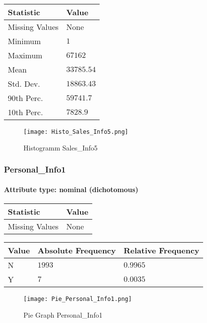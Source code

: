 \begin{table}[H]
	\renewcommand{\arraystretch}{1.25}
	\begin{tabular}{l|l}
		\textbf{Statistic} & \textbf{Value}\\\hline
		Missing Values& None\\\hline
		Minimum& $1$\\\hline
		Maximum& $67162$\\\hline
		Mean& $33785.54$\\\hline
		Std. Dev.& $18863.43$\\\hline
		90th Perc. & $59741.7$\\\hline
		10th Perc. & $7828.9$ \\		
	\end{tabular}
\end{table}
\begin{figure}[H]
	\begin{center}
		\texttt{[image: Histo\_Sales\_Info5.png]}
	\end{center}
	\caption{Histogramm Sales\_Info5}
\end{figure}

\subsubsection{Personal\_Info1}
\paragraph{Attribute type: nominal (dichotomous)}\quad

\begin{table}[H]
	\renewcommand{\arraystretch}{1.25}
	\begin{tabular}{l|l}
		\textbf{Statistic} & \textbf{Value}\\\hline
		Missing Values& None\\\hline
	\end{tabular}
\end{table}
\begin{table}[H]
	\renewcommand{\arraystretch}{1.25}
	\begin{tabular}{l|l|l}
		\textbf{Value} & \textbf{Absolute Frequency} & \textbf{Relative Frequency}\\\hline
		N&$1993$&$0.9965$\\\hline
		Y&$7$&$0.0035$
	\end{tabular}
\end{table}

\begin{figure}[H]
	\begin{center}
		\texttt{[image: Pie\_Personal\_Info1.png]}
	\end{center}
	\caption{Pie Graph Personal\_Info1}
\end{figure}

